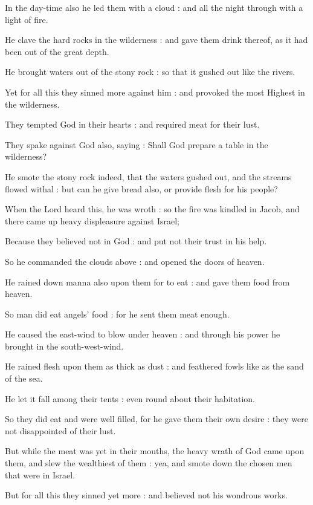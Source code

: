 In the day-time also he led them with a cloud : and all the night through with a light of fire.\par
{}He clave the hard rocks in the wilderness : and gave them drink thereof, as it had been out of the great depth.\par
{}He brought waters out of the stony rock : so that it gushed out like the rivers.\par
{}Yet for all this they sinned more against him : and provoked the most Highest in the wilderness.\par
{}They tempted God in their hearts : and required meat for their lust.\par
{}They spake against God also, saying : Shall God prepare a table in the wilderness?\par
{}He smote the stony rock indeed, that the waters gushed out, and the streams flowed withal : but can he give bread also, or provide flesh for his people?\par
{}When the Lord heard this, he was wroth : so the fire was kindled in Jacob, and there came up heavy displeasure against Israel;\par
{}Because they believed not in God : and put not their trust in his help.\par
{}So he commanded the clouds above : and opened the doors of heaven.\par
{}He rained down manna also upon them for to eat : and gave them food from heaven.\par
{}So man did eat angels' food : for he sent them meat enough.\par
{}He caused the east-wind to blow under heaven : and through his power he brought in the south-west-wind.\par
{}He rained flesh upon them as thick as dust : and feathered fowls like as the sand of the sea.\par
{}He let it fall among their tents : even round about their habitation.\par
{}So they did eat and were well filled, for he gave them their own desire : they were not disappointed of their lust.\par
{}But while the meat was yet in their mouths, the heavy wrath of God came upon them, and slew the wealthiest of them : yea, and smote down the chosen men that were in Israel.\par
{}But for all this they sinned yet more : and believed not his wondrous works.\par
